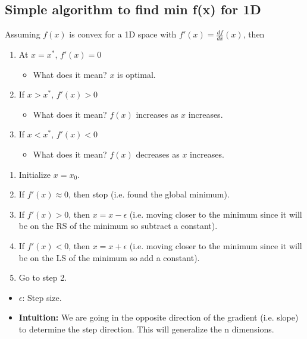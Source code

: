 \subsection{Simple algorithm to find min f(x) for 1D}
\begin{intuition}
    Assuming $f(x)$ is convex for a 1D space with \( f'(x) = \frac{df}{dx}(x) \), then 
    \begin{enumerate}
    
        \item At \( x = x^* \), \( f'(x) = 0 \)
        \begin{itemize}
            \item What does it mean? \( x \) is optimal.
        \end{itemize}
    
        \item If \( x > x^* \), \( f'(x) > 0 \)
        \begin{itemize}
            \item What does it mean? \( f(x) \) increases as \( x \) increases.
        \end{itemize}
    
        \item If \( x < x^* \), \( f'(x) < 0 \)
        \begin{itemize}
            \item What does it mean? \( f(x) \) decreases as \( x \) increases.
        \end{itemize}
        
    \end{enumerate}   
\end{intuition}

\begin{definition}
    \begin{enumerate}
        \item Initialize $x = x_0$.
        \item If $f'(x) \approx 0$, then stop (i.e. found the global minimum).
        \item If $f'(x) > 0$, then $x = x - \epsilon$ (i.e. moving closer to the minimum since it will be on the RS of the minimum so subtract a constant).
        \item If $f'(x) < 0$, then $x = x + \epsilon$ (i.e. moving closer to the minimum since it will be on the LS of the minimum so add a constant).
        \item Go to step 2.
    \end{enumerate}
    \vspace{1em}

    \begin{itemize}
        \item $\epsilon$: Step size.
        \item \textbf{Intuition:} We are going in the opposite direction of the gradient (i.e. slope) to determine the step direction. This will generalize the n dimensions.
    \end{itemize}
\end{definition}

